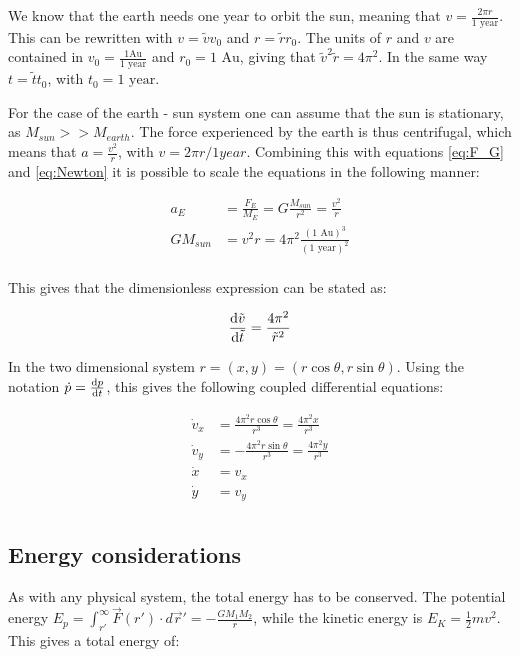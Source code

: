 We know that the earth needs one year to orbit the sun, meaning that $ v = \frac{2\pi r}{\text{1 year}} $. This can be rewritten with $ v = \tilde{v}v_0 $ and $ r = \tilde{r}r_0 $. The units of $ r $ and $ v $ are contained in  $ v_0 = \frac{1 \text{Au}}{1 \text{ year}} $ and $ r_0=1\text{ Au} $, giving that $ \tilde{v}^2\tilde{r} = 4\pi^2 $. In the same way $ t = \tilde{t}t_0 $, with $ t_0 = 1 \text{ year} $. 


For the case of the earth - sun system one can assume that the sun is stationary, as $ M_{sun}>> M_{earth} $. The force experienced by the earth is thus centrifugal, which means that $ a = \frac{v^2}{r} $, with $ v = 2\pi r /1year $.  
Combining this with equations \ref{eq:F_G} and \ref{eq:Newton} it is possible to scale the equations in the following manner:

\begin{align}
	{a}_E &= \frac{{F}_E}{M_E}= G\frac{M_{sun}}{r^2} 
= \frac{v^2}{r}\\
	GM_{sun}&= v^2 r = 4\pi^2 \frac{(\text{1 Au})^3}{(\text{1 year})^2}\\
\end{align}

This gives that the dimensionless expression can be stated as: 

	\begin{equation}
		\dv{\tilde{v}}{\tilde{t}} = \frac{4\pi^2}{\tilde{r}^2} 
	\end{equation}
	
In the two dimensional system $ r = (x,y) = (r\cos\theta, r\sin\theta) $. Using the notation $ 	\dot{p}  = \dv{p}{t}$, this gives the following coupled differential equations: 

\begin{align}
\dot{v}_x  &=  \frac{4\pi^2r\cos\theta}{{r}^3}  = \frac{4\pi^2x}{{r}^3} \\
\dot{v}_y	 &= -\frac{4\pi^2r\sin\theta}{{r}^3}  = \frac{4\pi^2y}{{r}^3}\\
	\dot{x}  &= v_x\\
	\dot{y}  &= v_y\\
\end{align}

\subsection{Energy considerations}

As with any physical system, the total energy has to be conserved. The potential energy $ E_p = \int_{r'}^{\infty} \vec{F}(r') \cdot  d\vec{r}' = -\frac{G	M_1M_2}{r} $, while the kinetic energy is $ E_K  = \frac{1}{2}mv^2$. This gives a total energy of:

